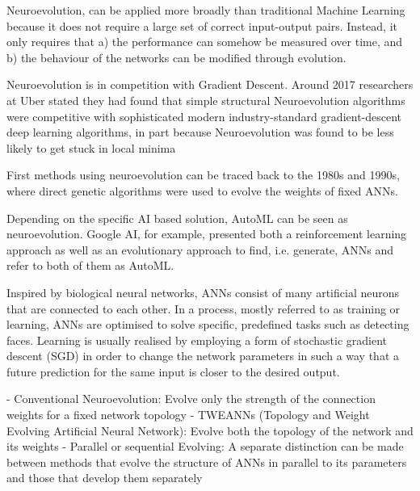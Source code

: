 \documentclass[journal, a4paper]{IEEEtran}
\begin{document}
Neuroevolution, can be applied more broadly than traditional Machine Learning because it does not require a large set of correct input-output pairs. Instead, it only requires that a) the performance can somehow be measured over time, and b) the behaviour of the networks can be modified through evolution. \cite{cite05}

Neuroevolution is in competition with Gradient Descent. Around 2017 researchers at Uber stated they had found that simple structural Neuroevolution algorithms were competitive with sophisticated modern industry-standard gradient-descent deep learning algorithms, in part because Neuroevolution was found to be less likely to get stuck in local minima \cite{cite05}

First methods using neuroevolution can be traced back to the 1980s and 1990s, where direct genetic algorithms were used to evolve the weights of fixed ANNs.\cite{cite05}

Depending on the specific AI based solution, AutoML can be seen as neuroevolution. Google AI, for example, presented both a reinforcement learning approach as well as an evolutionary approach to find, i.e. generate, ANNs and refer to both of them as AutoML. \cite{cite05}

Inspired by biological neural networks, ANNs consist of many artificial neurons that are connected to each other. In a process, mostly referred to as training or learning, ANNs are optimised to solve specific, predefined tasks such as detecting faces. Learning is usually realised by employing a form of stochastic gradient descent (SGD) in order to change the network parameters in such a way that a future prediction for the same input is closer to the desired output. \cite{cite05}

- Conventional Neuroevolution: Evolve only the strength of the connection weights for a fixed network topology
- TWEANNs (Topology and Weight Evolving Artificial Neural Network): Evolve both the topology of the network and its weights
- Parallel or sequential Evolving: A separate distinction can be made between methods that evolve the structure of ANNs in parallel to its parameters and those that develop them separately



\end{document}
